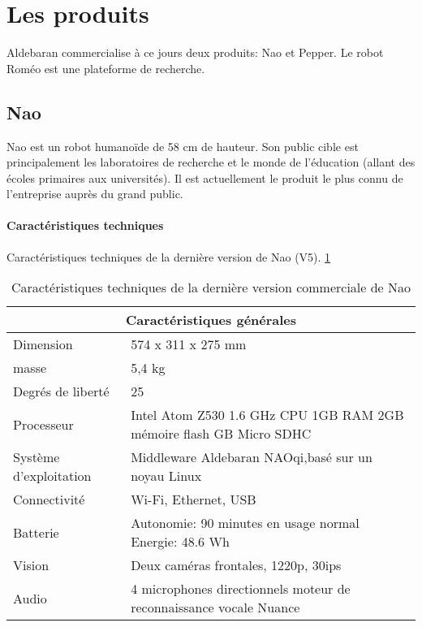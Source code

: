 \section{Les produits}
\label{Entreprise: Les produits}
Aldebaran commercialise à ce jours deux produits: Nao et Pepper. Le robot Roméo est une plateforme de recherche. 

\subsection{Nao}
\label{Entreprise: Les produits: Nao}
Nao est un robot humanoïde de 58 cm de hauteur. Son public cible est principalement les laboratoires de recherche et le monde de l'éducation (allant des écoles primaires aux universités). Il est actuellement le produit le plus connu de l'entreprise auprès du grand public. 

\paragraph{Caractéristiques techniques}
\label{Entreprise:Les produits: Nao: Caractéristiques techniques}
Caractéristiques techniques de la dernière version de Nao (V5). \ref{tab: Caractéristiques technique de Nao}

\begin{table}[h]
\begin{tabular}{ | l | p{7cm} | }
\hline
\multicolumn{2}{|c|}{Caractéristiques générales} \\
\hline
Dimension & 574 x 311 x 275 mm \\
\hline 
masse & 5,4 kg \\
\hline 
Degrés de liberté  & 25 \\
\hline
Processeur & Intel Atom Z530 1.6 GHz CPU \newline 1GB RAM \newline 2GB mémoire flash \newline 8 GB Micro SDHC \\
\hline
Système d'exploitation & Middleware Aldebaran NAOqi,\newline basé sur un noyau Linux \\
\hline
Connectivité & Wi-Fi, Ethernet, USB \\
\hline
 Batterie & Autonomie: 90 minutes en usage normal \newline Energie: 48.6 Wh \\
\hline 
Vision & Deux caméras frontales, 1220p, 30ips \\
\hline
Audio & 4 microphones directionnels \newline moteur de reconnaissance vocale Nuance  \\
\hline

\end{tabular}
\caption[Caractéristiques technique de Nao]{Caractéristiques techniques de la dernière version commerciale  de Nao}
\label {tab: Caractéristiques technique de Nao}
\end{table}

